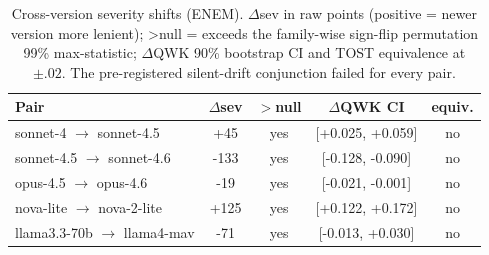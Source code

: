 \begin{table}[t]\centering\caption{Cross-version severity shifts (ENEM). $\Delta$sev in raw points (positive = newer version more lenient); >null = exceeds the family-wise sign-flip permutation 99\% max-statistic; $\Delta$QWK 90\% bootstrap CI and TOST equivalence at $\pm.02$. The pre-registered silent-drift conjunction failed for every pair.}
\label{tab:versions}\small\begin{tabular}{lcccc}\toprule
Pair & $\Delta$sev & $>$null & $\Delta$QWK CI & equiv. \\ \midrule
sonnet-4 $\to$ sonnet-4.5 & +45 & yes & [+0.025, +0.059] & no \\
sonnet-4.5 $\to$ sonnet-4.6 & -133 & yes & [-0.128, -0.090] & no \\
opus-4.5 $\to$ opus-4.6 & -19 & yes & [-0.021, -0.001] & no \\
nova-lite $\to$ nova-2-lite & +125 & yes & [+0.122, +0.172] & no \\
llama3.3-70b $\to$ llama4-mav & -71 & yes & [-0.013, +0.030] & no \\
\bottomrule\end{tabular}\end{table}

